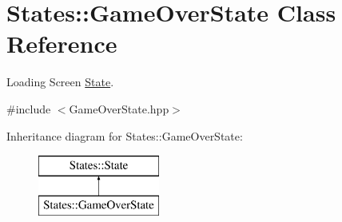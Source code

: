 \hypertarget{class_states_1_1_game_over_state}{}\section{States\+::Game\+Over\+State Class Reference}
\label{class_states_1_1_game_over_state}


Loading Screen \mbox{\hyperlink{class_states_1_1_state}{State}}.  




{\ttfamily \#include $<$Game\+Over\+State.\+hpp$>$}

Inheritance diagram for States\+::Game\+Over\+State\+:\begin{figure}[H]
\begin{center}
\leavevmode
\includegraphics[height=2.000000cm]{class_states_1_1_game_over_state}
\end{center}
\end{figure}
